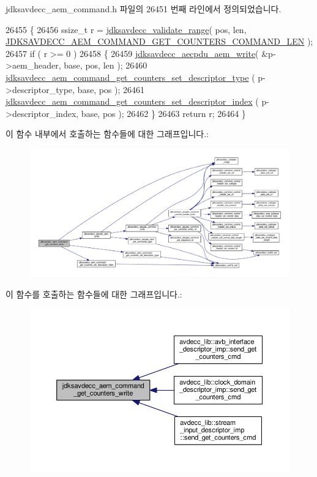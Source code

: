 jdksavdecc\+\_\+aem\+\_\+command.\+h 파일의 26451 번째 라인에서 정의되었습니다.


\begin{DoxyCode}
26455 \{
26456     ssize\_t r = \hyperlink{group__util_ga9c02bdfe76c69163647c3196db7a73a1}{jdksavdecc\_validate\_range}( pos, len, 
      \hyperlink{group__command__get__counters_ga172bfd9e43b26f1b23588cdc172e6940}{JDKSAVDECC\_AEM\_COMMAND\_GET\_COUNTERS\_COMMAND\_LEN} );
26457     \textcolor{keywordflow}{if} ( r >= 0 )
26458     \{
26459         \hyperlink{group__aecpdu__aem_gad658e55771cce77cecf7aae91e1dcbc5}{jdksavdecc\_aecpdu\_aem\_write}( &p->aem\_header, base, pos, len );
26460         \hyperlink{group__command__get__counters_ga665bf52a47ee7dddb31ef4a2013d504f}{jdksavdecc\_aem\_command\_get\_counters\_set\_descriptor\_type}
      ( p->descriptor\_type, base, pos );
26461         \hyperlink{group__command__get__counters_gabf2b73fe6d83457db85b9b45ea3cfc57}{jdksavdecc\_aem\_command\_get\_counters\_set\_descriptor\_index}
      ( p->descriptor\_index, base, pos );
26462     \}
26463     \textcolor{keywordflow}{return} r;
26464 \}
\end{DoxyCode}


이 함수 내부에서 호출하는 함수들에 대한 그래프입니다.\+:
\nopagebreak
\begin{figure}[H]
\begin{center}
\leavevmode
\includegraphics[width=350pt]{group__command__get__counters_ga9f15bd3b2fbf66748cde02c11f91af86_cgraph}
\end{center}
\end{figure}




이 함수를 호출하는 함수들에 대한 그래프입니다.\+:
\nopagebreak
\begin{figure}[H]
\begin{center}
\leavevmode
\includegraphics[width=350pt]{group__command__get__counters_ga9f15bd3b2fbf66748cde02c11f91af86_icgraph}
\end{center}
\end{figure}


